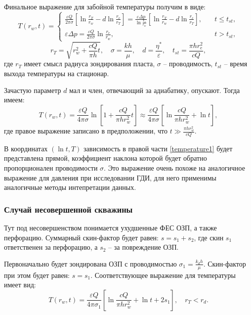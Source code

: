 	Финальное выражение для забойной температуры получим в виде:
\begin{equation}
	\label{temperature}
		T(r_w, t) = 
	\begin{cases}
		\displaystyle\frac{\varepsilon Q}{2\pi \sigma}\left[\ln\displaystyle\frac{r_T}{r_w}-d\ln\displaystyle\frac{r_e}{r_T}\right] = \displaystyle\frac{\varepsilon \Delta p}{\ln \displaystyle\frac{r_e}{r_w}}\left[\ln\displaystyle\frac{r_T}{r_w}-d\ln\displaystyle\frac{r_e}{r_T}\right], &\quad t\leq t_{st} ,\\
		\varepsilon \Delta p =  \displaystyle\frac{\varepsilon Q}{2\pi\sigma}\ln\frac{r_e}{r_w}, &\quad t>t_{st},
	\end{cases}
\end{equation}
\begin{equation}
	\label{terms33}
	r_T = \sqrt{r_w^2 + \frac{cQ}{\pi h}t}, \quad
	\sigma = \frac{kh}{\mu}, \quad d = \frac{\eta^{\ast}}{\varepsilon}, \quad
	t_{st} = \frac{\pi h r_e^2}{cQ},
\end{equation}
	где $r_T$ имеет смысл радиуса зондирования пласта,
	$\sigma$ -- проводимость,
	$t_{st}$ -- время выхода температуры на стационар.

	Зачастую параметр $d$ мал и член, отвечающий за адиабатику, опускают. Тогда имеем:
\begin{equation}
	\label{temperature1}
	T(r_w, t) = \frac{\varepsilon Q}{4 \pi \sigma}\ln\left[1+\frac{cQ}{\pi h r_w^2}t\right]	\approx
	\frac{\varepsilon Q}{4 \pi \sigma}\left[\ln\frac{cQ}{\pi h r_w^2}+\ln t\right],
\end{equation}
	где правое выражение записано в предположении, что $t \gg \displaystyle\frac{\pi h r_w^2}{cQ}$.
	
	В координатах $(\ln{t}, T)$ зависимость в правой части \eqref{temperature1} будет представлена прямой, коэффициент наклона которой будет обратно пропорционален проводимости $\sigma$.
	Это выражение очень похоже на аналогичное выражение для давления при исследовании ГДИ, для него применимы аналогичные методы интепретации данных.

\subsubsection{Случай несовершенной скважины}
	Тут под несовершенством понимается ухудшенные ФЕС ОЗП, а также перфорацию.
	Суммарный скин-фактор будет равен: $s = s_1 + s_2$, где скин $s_1$ ответственен за перфорацию, а $s_2$ -- за повреждение ОЗП.
	
	Первоначально будет зондирована ОЗП с проводимостью $\sigma_1 = \frac{k_dh}{\mu}$. Скин-фактор при этом будет равен:
	$s = s_1$.
	Соответствующее выражение для температуры имеет вид:
\begin{equation}
	\label{temperature2}
	T(r_w, t) = \frac{\varepsilon Q}{4 \pi \sigma_1}\left[\ln\frac{cQ}{\pi h r_w^2}+\ln t + 2s_1\right],
	\quad r_T < r_d.
\end{equation}
	
